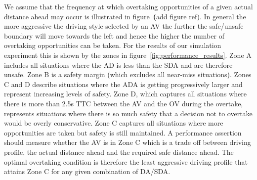 We assume that the frequency at which overtaking opportunities of a given actual distance ahead may occur is illustrated in figure~\textbf(add figure ref). 
%
In general the more aggressive the driving style selected by an AV the further the safe/unsafe boundary will move towards the left and hence the higher the number of overtaking opportunities can be taken. 
%
For the results of our simulation experiment this is shown by the zones in figure~\ref{fig:performance_results}. 
%
Zone A includes all situations where the AD is less than the SDA and are therefore unsafe. Zone B is a safety margin (which excludes all near-miss situations). Zones C and D describe situations where the ADA is getting progressively larger and represent increasing levels of safety. 
%
Zone D, which captures all situations where there is more than 2.5s TTC between the AV and the OV during the overtake, represents situations where there is so much safety that a decision not to overtake would be overly conservative. Zone C captures all situations where more opportunities are taken but safety is still maintained.
%
A performance assertion should measure whether the AV is in Zone C which is a trade off between driving profile, the actual distance ahead and the required safe distance ahead. The optimal overtaking condition is therefore the least aggressive driving profile that attains Zone C for any given combination of DA/SDA. 



%
%

